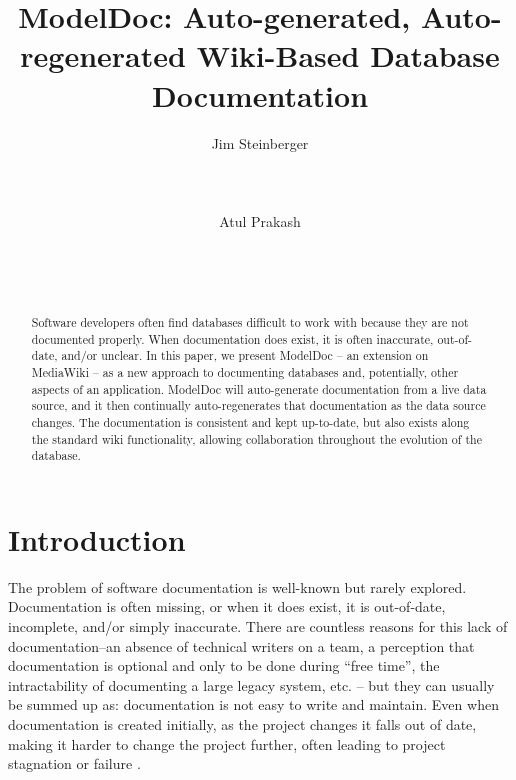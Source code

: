 \documentclass[nocopyrightspace]{acm_proc_article-sp}
\begin{document}
\title{{\ttlit ModelDoc}: Auto-generated, Auto-regenerated Wiki-Based Database
Documentation}

\author{
  \alignauthor
  Jim Steinberger\\
         \\
         \\
         \\
  \alignauthor
  Atul Prakash\\
         \\
         \\
         \\
}

\maketitle

\begin{abstract}
Software developers often find databases difficult to work with because they
are not documented properly.  When documentation does exist, it is often
inaccurate, out-of-date, and/or unclear.  In this paper, we present ModelDoc --
an extension on MediaWiki -- as a new approach to documenting databases and,
potentially, other aspects of an application.  ModelDoc will auto-generate
documentation from a live data source, and it then continually auto-regenerates
that documentation as the data source changes.  The documentation is consistent
and kept up-to-date, but also exists along the standard wiki functionality,
allowing collaboration throughout the evolution of the database.
\end{abstract}



\section{Introduction}
The problem of software documentation is well-known but rarely explored. 
Documentation is often missing, or when it does exist, it is out-of-date,
incomplete, and/or simply inaccurate. There are countless reasons for
this lack of documentation--an absence of technical writers on a team, a
perception that documentation is optional and only to be done during ``free
time'', the intractability of documenting a large legacy system, etc. -- but they 
can usually be summed up as: documentation is not easy to write and maintain. Even 
when documentation is created initially, as the project changes it falls out of date, 
making it harder to change the project further, often leading to project 
stagnation or failure \cite{desouza:documentation} \cite{sousa:maintenance}. 
\end{document}
